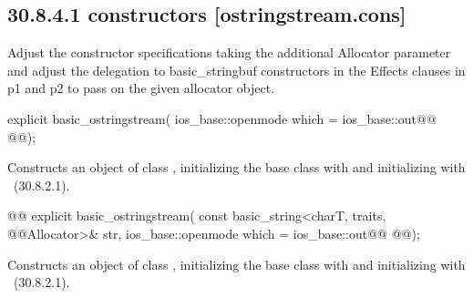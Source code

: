 \documentclass[ebook,11pt,article]{memoir}
\begin{document}
\subsection{30.8.4.1  constructors [ostringstream.cons]}
Adjust the constructor specifications taking the additional Allocator parameter and adjust the delegation to basic_stringbuf constructors in the Effects clauses in p1 and p2 to pass on the given allocator object.

\begin{itemdecl}
explicit basic_ostringstream(
  ios_base::openmode which = ios_base::out@\added{,}@
  @@);
\end{itemdecl}

\begin{itemdescr}
\pnum
\effects
Constructs an object of class
,
initializing the base class with
and initializing  with
~({30.8.2.1}).
\end{itemdescr}

\begin{itemdecl}
@@
explicit basic_ostringstream(
  const basic_string<charT, traits, @@Allocator>& str,
  ios_base::openmode which = ios_base::out@\added{,}@
  @@);
\end{itemdecl}

\begin{itemdescr}
\pnum
\effects
Constructs an object of class
,
initializing the base class with
and initializing  with
~({30.8.2.1}).
\end{itemdescr}


\end{document}
